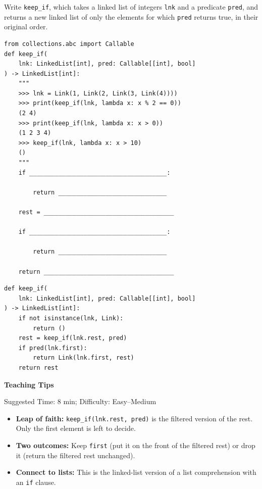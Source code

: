 \begin{blocksection}
\question Write \lstinline{keep_if}, which takes a linked list of integers \lstinline{lnk} and a predicate \lstinline{pred}, and returns a new linked list of only the elements for which \lstinline{pred} returns true, in their original order.

\begin{lstlisting}
from collections.abc import Callable
def keep_if(
    lnk: LinkedList[int], pred: Callable[[int], bool]
) -> LinkedList[int]:
    """
    >>> lnk = Link(1, Link(2, Link(3, Link(4))))
    >>> print(keep_if(lnk, lambda x: x % 2 == 0))
    (2 4)
    >>> print(keep_if(lnk, lambda x: x > 0))
    (1 2 3 4)
    >>> keep_if(lnk, lambda x: x > 10)
    ()
    """
    if ______________________________________:

        return ______________________________

    rest = ____________________________________

    if ______________________________________:

        return ______________________________

    return ____________________________________
\end{lstlisting}
\begin{solution}[1in]
\begin{lstlisting}
def keep_if(
    lnk: LinkedList[int], pred: Callable[[int], bool]
) -> LinkedList[int]:
    if not isinstance(lnk, Link):
        return ()
    rest = keep_if(lnk.rest, pred)
    if pred(lnk.first):
        return Link(lnk.first, rest)
    return rest
\end{lstlisting}
\end{solution}
\end{blocksection}

\begin{questionmeta}
\textbf{Teaching Tips}\par\nopagebreak[4]
Suggested Time: 8 min; Difficulty: Easy--Medium
\nopagebreak[4]
\begin{itemize}
    \item \textbf{Leap of faith:} \lstinline{keep_if(lnk.rest, pred)} is the filtered version of the rest. Only the first element is left to decide.
    \item \textbf{Two outcomes:} Keep \lstinline{first} (put it on the front of the filtered rest) or drop it (return the filtered rest unchanged).
    \item \textbf{Connect to lists:} This is the linked-list version of a list comprehension with an \lstinline{if} clause.
\end{itemize}
\end{questionmeta}
